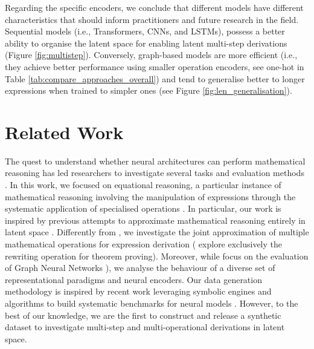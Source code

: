 \documentclass[11pt]{article}
\begin{document}
Regarding the specific encoders, we conclude that different models have different characteristics that should inform practitioners and future research in the field. Sequential models (i.e., Transformers, CNNs, and LSTMs), possess a better ability to organise the latent space for enabling latent multi-step derivations (Figure \ref{fig:multistep}). Conversely, graph-based models are more efficient (i.e., they achieve better performance using smaller operation encoders, see one-hot in Table \ref{tab:compare_approaches_overall}) and tend to generalise better to longer expressions when trained to simpler ones (see Figure \ref{fig:len_generalisation}).

\section{Related Work}

The quest to understand whether neural architectures can perform mathematical reasoning has led researchers to investigate several tasks and evaluation methods \cite{lu-etal-2023-survey,meadows2023introduction,mishra-etal-2022-lila,ferreira-etal-2022-integer,ferreira2020premise,welleck2021naturalproofs,valentino-etal-2022-textgraphs,mishra2022numglue,petersen-etal-2023-neural}.
In this work, we focused on equational reasoning, a particular instance of mathematical reasoning involving the manipulation of expressions through the systematic application of specialised operations \cite{welleck2022symbolic,lample2019deep,saxton2018analysing}.
In particular, our work is inspired by previous attempts to approximate mathematical reasoning entirely in latent space \cite{lee2019mathematical}. Differently from \citet{lee2019mathematical}, we investigate the joint approximation of multiple mathematical operations for expression derivation (\citet{lee2019mathematical} explore exclusively the rewriting operation for theorem proving). Moreover, while \citet{lee2019mathematical} focus on the evaluation of Graph Neural Networks \cite{paliwal2020graph}), we analyse the behaviour of a diverse set of representational paradigms and neural encoders.
Our data generation methodology is inspired by recent work leveraging symbolic engines and algorithms to build systematic benchmarks for neural models \cite{meadows2023symbolic,meadows2023generating,chen2022program,saparov2023testing}. However, to the best of our knowledge, we are the first to construct and release a synthetic dataset to investigate multi-step and multi-operational derivations in latent space.
\end{document}
